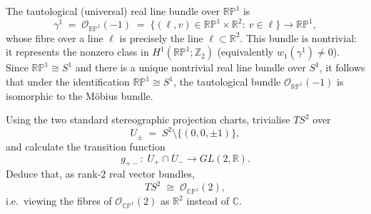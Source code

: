 \begin{solution}
The tautological (universal) real line bundle over $\mathbb{RP}^1$ is
\[
\gamma^1 \;=\; \mathcal{O}_{\mathbb{RP}^1}(-1)
\;=\; \{(\ell,v)\in \mathbb{RP}^1\times \mathbb{R}^2:\ v\in \ell\}\longrightarrow \mathbb{RP}^1,
\]
whose fibre over a line $\ell$ is precisely the line $\ell\subset \mathbb{R}^2$.
This bundle is nontrivial: it represents the nonzero class in $H^1(\mathbb{RP}^1;\mathbb{Z}_2)$
(equivalently $w_1(\gamma^1)\neq 0$). Since $\mathbb{RP}^1\cong S^1$ and there is a unique nontrivial
real line bundle over $S^1$, it follows that under the identification $\mathbb{RP}^1\cong S^1$,
the tautological bundle $\mathcal{O}_{\mathbb{RP}^1}(-1)$ is isomorphic to the M\"{o}bius bundle.



\end{solution}

\begin{problem}
\label{prob:cp-vii-0029}

\noindent Using the two standard stereographic projection charts, trivialise $TS^2$ over
\[
U_\pm \;=\; S^2\setminus\{(0,0,\pm 1)\},
\]
and calculate the transition function
\[
g_{+-}:\; U_+\cap U_- \longrightarrow GL(2,\mathbb{R}).
\]
Deduce that, as rank-$2$ real vector bundles,
\[
TS^2 \;\cong\; \mathcal{O}_{\mathbb{CP}^1}(2),
\]
i.e.\ viewing the fibres of $\mathcal{O}_{\mathbb{CP}^1}(2)$ as $\mathbb{R}^2$ instead of $\mathbb{C}$.



\end{problem}

